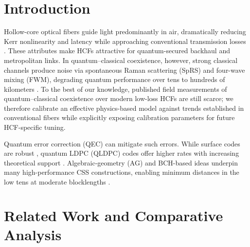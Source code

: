 \documentclass{article}
\begin{document}
\section{Introduction}

Hollow-core optical fibers guide light predominantly in air, dramatically reducing Kerr nonlinearity and latency while approaching conventional transmission losses \cite{Benabid2006JLT,Poletti2014OPEX}. These attributes make HCFs attractive for quantum-secured backhaul and metropolitan links. In quantum--classical coexistence, however, strong classical channels produce noise via spontaneous Raman scattering (SpRS) and four-wave mixing (FWM), degrading quantum performance over tens to hundreds of kilometers \cite{Eraerds2010NJP,Patel2012PRX,Kumar2015NJP}. To the best of our knowledge, published field measurements of quantum--classical coexistence over modern low-loss HCFs are still scarce; we therefore calibrate an effective physics-based model against trends established in conventional fibers while explicitly exposing calibration parameters for future HCF-specific tuning.

Quantum error correction (QEC) can mitigate such errors. While surface codes are robust \cite{Fowler2012PRA}, quantum LDPC (QLDPC) codes offer higher rates with increasing theoretical support \cite{Kovalev2013PRA,TillichZemor2014TIT,BreuckmannEberhardt2021PRXQ,Panteleev2022STOC}. Algebraic-geometry (AG) and BCH-based ideas underpin many high-performance CSS constructions, enabling minimum distances in the low tens at moderate blocklengths \cite{Ashikhmin2001PRA,ChenLing2008TIT}.

\section{Related Work and Comparative Analysis}\label{sec:related}
\end{document}
